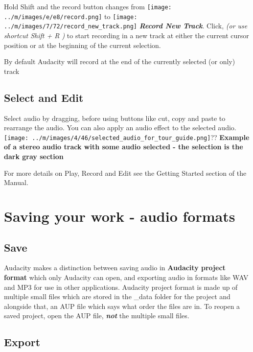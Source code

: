 \documentclass[twocolumn]{book}
\begin{document}
Hold Shift and the record button changes from \texttt{[image: ../m/images/e/e8/record.png]} to \texttt{[image: ../m/images/7/72/record\_new\_track.png]} \textit{\textbf{Record New Track}}.  Click, \textit{(or use shortcut Shift + R )} to start recording in a new track at either the current cursor position or at the beginning of the current selection.

By default Audacity will record at the end of the currently selected (or only) track

\subsection{Select and Edit}


Select audio by dragging, before using buttons like cut, copy and paste to rearrange the audio.  You can also apply an audio effect to the selected audio.\texttt{[image: ../m/images/4/46/selected\_audio\_for\_tour\_guide.png]}??
\textbf{Example of a stereo audio track with some audio selected - the selection is the dark gray section}

For more details on Play, Record and Edit see the Getting Started section of the Manual.




\section{Saving your work - audio formats}


\subsection{Save}


Audacity makes a distinction between saving audio in \textbf{Audacity project format} which only Audacity can open, and exporting audio in formats like WAV and MP3 for use in other applications. Audacity project format is made up of multiple small files which are stored in the \_data folder for the project and alongside that, an  AUP file which says what order the files are in. To reopen a saved project, open the AUP file, \textit{\textbf{not}} the multiple small files. 

\subsection{Export}
\end{document}
